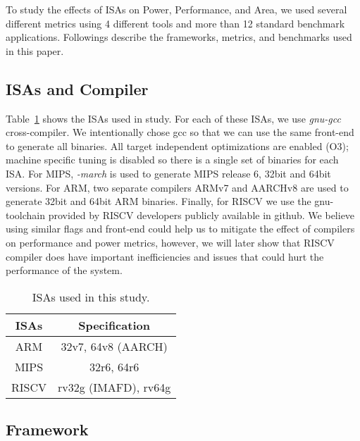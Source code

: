 
\label{sec:method}

\newcommand{\icount}{\textsc{icount}\xspace}

To study the effects of ISAs on Power, Performance, and Area, we used several different metrics using 4 different tools and more than 12 standard benchmark applications. Followings describe the frameworks, metrics, and benchmarks used in this paper. %

\subsection{ISAs and Compiler}
Table~\ref{t:isa} shows the ISAs used in study. For each of these ISAs, we use \textit{gnu-gcc} cross-compiler. We intentionally chose gcc so
that we can use the same front-end to generate all binaries. All
target independent optimizations are enabled (O3); machine specific
tuning is disabled so there is a single set of binaries for each ISA. For MIPS, \textit{-march} is used to generate MIPS release 6, 32bit and 64bit versions. For ARM, two separate compilers ARMv7 and AARCHv8 are used to generate 32bit and 64bit ARM binaries. Finally, for RISCV we use the gnu-toolchain provided by RISCV developers publicly available in github. We believe using similar flags and front-end could help us to mitigate the effect of compilers on performance and power metrics, however, we will later show that RISCV compiler does have important inefficiencies and issues that could hurt the performance of the system. 

\begin{table}[h]
\centering
\caption{ISAs used in this study.}
\begin{tabular}{|c|c|}
\hline
\small \textbf{ISAs} & \small \textbf{Specification} \\
\hline \hline
\small ARM & \small  32v7, 64v8 (AARCH) \\
\hline
\small MIPS & \small 32r6, 64r6 \\
\hline
\small RISCV &\small  rv32g (IMAFD), rv64g \\
\hline
\end{tabular}
\label{t:isa}
\end{table}

\subsection{Framework} 

